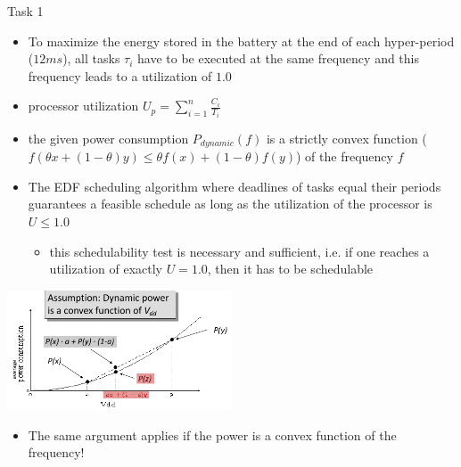 \begin{frame}[allowframebreaks]{Task 1}{}
\begin{solution}
  \end{solution}
  \framebreak
  \begin{tasknoinc}
    \begin{itemize}
      \item To maximize the energy stored in the battery at the end of each hyper-period ($12 ms$), all tasks $ \tau_i$ have to be executed at the same frequency and this frequency leads to a utilization of $1.0$
    \end{itemize}
  \end{tasknoinc}
  \framebreak
  \begin{requirementsnoinc}
    \begin{itemize}
      \item \alert{processor utilization} $\displaystyle U_p = \sum_{i=1}^n \frac{C_i}{T_i}$
      \item the given power consumption $P_{dynamic}(f)$ is a \alert{strictly convex} function ($f(\theta x+(1-\theta) y) \leq \theta f(x)+(1-\theta) f(y)$) of the frequency $f$
      \item The EDF scheduling algorithm where deadlines of tasks equal their periods guarantees a feasible schedule as long as the utilization of the processor is $U \le 1.0$
        \begin{itemize}
          \item this schedulability test is \alert{necessary} and \alert{sufficient}, i.e. if one reaches a utilization of exactly $U = 1.0$, then it has to be schedulable
        \end{itemize}
    \end{itemize}
  \end{requirementsnoinc}
  \begin{requirementsnoinc}
    \centering
    \includegraphics[width=0.5\textwidth]{./figures/task2_power_convex.png}
    \begin{itemize}
        \item The same argument applies if the power is a convex function of the \alert{frequency}!
    \end{itemize}
  \end{requirementsnoinc}
  \begin{solutionnoinc}

\end{solutionnoinc}
\end{frame}
